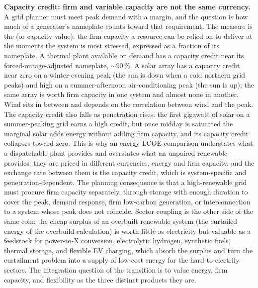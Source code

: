 \begin{mastery}
\textbf{Capacity credit: firm and variable capacity are not the same
currency.} A grid planner must meet peak demand with a margin, and the
question is how much of a generator's nameplate counts toward that
requirement. The measure is the  (or capacity
value): the firm capacity a resource can be relied on to deliver at the
moments the system is most stressed, expressed as a fraction of its
nameplate. A thermal plant available on demand has a capacity credit near
its forced-outage-adjusted nameplate, $\sim 90\,\%$. A solar array has a
capacity credit near zero on a winter-evening peak (the sun is down when a
cold northern grid peaks) and high on a summer-afternoon air-conditioning
peak (the sun is up); the same array is worth firm capacity in one system
and almost none in another. Wind sits in between and depends on the
correlation between wind and the peak. The capacity credit also falls as
penetration rises: the first gigawatt of solar on a summer-peaking grid
earns a high credit, but once midday is saturated the marginal solar adds
energy without adding firm capacity, and its capacity credit collapses
toward zero. This is why an energy LCOE comparison understates what a
dispatchable plant provides and overstates what an unpaired renewable
provides: they are priced in different currencies, energy and firm
capacity, and the exchange rate between them is the capacity credit, which
is system-specific and penetration-dependent. The planning consequence is
that a high-renewable grid must procure firm capacity separately, through
storage with enough duration to cover the peak, demand response, firm
low-carbon generation, or interconnection to a system whose peak does not
coincide. Sector coupling is the other side of the same coin: the cheap
surplus of an overbuilt renewable system (the curtailed energy of the
overbuild calculation) is worth little as electricity but valuable as a
feedstock for power-to-X conversion, electrolytic hydrogen, synthetic
fuels, thermal storage, and flexible EV charging, which absorb the surplus
and turn the curtailment problem into a supply of low-cost energy for the
hard-to-electrify sectors. The integration question of the transition is
to value energy, firm capacity, and flexibility as the three distinct
products they are.
\end{mastery}

